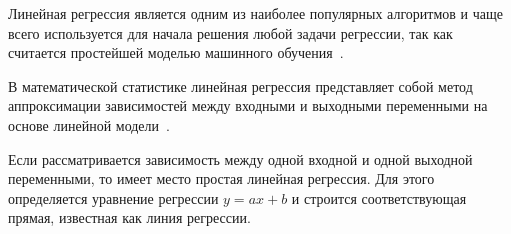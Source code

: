 %
%
%
%
%

Линейная регрессия является одним из наиболее популярных алгоритмов и чаще всего используется для начала решения любой задачи регрессии, так как считается простейшей моделью машинного обучения~\cite{kemer}.

В математической статистике линейная регрессия представляет собой метод аппроксимации зависимостей между входными и выходными переменными на основе линейной модели~\cite{loginom}.

Если рассматривается зависимость между одной входной и одной выходной переменными, то имеет место простая линейная регрессия.
Для этого определяется уравнение регрессии $y = ax + b$ и строится соответствующая прямая, известная как линия регрессии.

